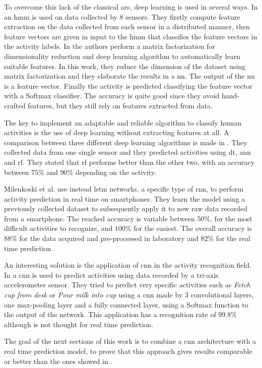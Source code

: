To overcome this lack of the classical \gls{ars}, deep learning is used in several ways.
In \cite{Guenterberg09} an \gls{hmm} is used on data collected by 8 sensors. They firstly compute feature extraction on the data collected from each sensor in a distributed manner, then feature vectors are given in input to the \gls{hmm} that classifies the feature vectors in the activity labels.
In \cite{Chikhaoui17} the authors perform a matrix factorization for dimensionality reduction and deep learning algorithm to automatically learn suitable features.
In this work, they reduce the dimension of the dataset using matrix factorization and they elaborate the results in a \gls{nn}. The output of the \gls{nn} is a feature vector. Finally the activity is predicted classifying the feature vector with a Softmax classifier.
The accuracy is quite good since they avoid hand-crafted features, but they still rely on features extracted from data.

The key to implement an adaptable and reliable algorithm to classify human activities is the use of deep learning without extracting features at all.
A comparison between three different deep learning algorithms is made in \cite{Xu2017}. They collected data from one single sensor and they predicted activities using \gls{dt}, \gls{ann} and \gls{rf}. They stated that \gls{rf} performs better than the other two, with an accuracy between $75 \%$ and $90 \%$ depending on the activity.

Milenkoski et al. use instead \gls{lstm} networks, a specific type of \gls{rnn}, to perform activity prediction in real time on smartphones.
They learn the model using a previously collected dataset to subsequently apply it to new raw data recorded from a smartphone. The reached accuracy is variable between $50\%$, for the most difficult activities to recognize, and $100\%$ for the easiest. The overall accuracy is $88\%$ for the data acquired and pre-processed in laboratory and $82\%$ for the real time prediction \cite{Milenkoski18}.

An interesting solution is the application of \gls{cnn} in the activity recognition field.
In \cite{Panwar17} a \gls{cnn} is used to predict activities using data recorded by a tri-axis accelerometer sensor. They tried to predict very specific activities such as \textit{Fetch cup from desk} or \textit{Pour milk into cup} using a \gls{cnn} made by 3 convolutional layers, one max-pooling layer and a fully connected layer, using a Softmax function to the output of the network.
This application has a recognition rate of $99.8\%$ although is not thought for real time prediction.

The goal of the next sections of this work is to combine a \gls{cnn} architecture with a real time prediction model, to prove that this approach gives results comparable or better than the ones showed in \cite{Korbinian}.